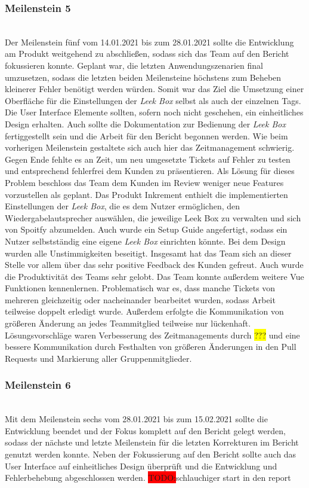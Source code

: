 \documentclass[10pt, a4paper]{article}
\begin{document}
\subsubsection*{Meilenstein 5} $~$ \\
Der Meilenstein fünf vom 14.01.2021 bis zum 28.01.2021 sollte die Entwicklung am Produkt weitgehend zu abschließen, sodass sich das Team auf den Bericht fokussieren konnte.
Geplant war, die letzten Anwendungszenarien final umzusetzen, sodass die letzten beiden Meilensteine höchstens zum Beheben kleinerer Fehler benötigt werden würden.
Somit war das Ziel die Umsetzung einer Oberfläche für die Einstellungen der \textit{Leek Box} selbst als auch der einzelnen Tags.
Die User Interface Elemente sollten, sofern noch nicht geschehen, ein einheitliches Design erhalten.
Auch sollte die Dokumentation zur Bedienung der \textit{Leek Box} fertiggestellt sein und die Arbeit für den Bericht begonnen werden.
Wie beim vorherigen Meilenstein gestaltete sich auch hier das Zeitmanagement schwierig.
Gegen Ende fehlte es an Zeit, um neu umgesetzte Tickets auf Fehler zu testen und entsprechend fehlerfrei dem Kunden zu präsentieren.
Als Lösung für dieses Problem beschloss das Team dem Kunden im Review weniger neue Features vorzustellen als geplant.
Das Produkt Inkrement enthielt die implementierten Einstellungen der \textit{Leek Box}, die es dem Nutzer ermöglichen, den Wiedergabelautsprecher auswählen, die jeweilige Leek Box zu verwalten und sich von Spoitfy abzumelden.
Auch wurde ein Setup Guide angefertigt, sodass ein Nutzer selbstständig eine eigene \textit{Leek Box} einrichten könnte.
Bei dem Design wurden alle Unstimmigkeiten beseitigt.
Insgesamt hat das Team sich an dieser Stelle vor allem über das sehr positive Feedback des Kunden gefreut.
Auch wurde die Produktivität des Teams sehr gelobt.
Das Team konnte außerdem weitere Vue Funktionen kennenlernen.
Problematisch war es, dass manche Tickets von mehreren gleichzeitig oder nacheinander bearbeitet wurden, sodass Arbeit teilweise doppelt erledigt wurde.
Außerdem erfolgte die Kommunikation von größeren Änderung an jedes Teammitglied teilweise nur lückenhaft.
Lösungsvorschläge waren Verbesserung des Zeitmanagements durch \colorbox{yellow}{???} und eine bessere Kommunikation durch Festhalten von größeren Änderungen in den Pull Requests und Markierung aller Gruppenmitglieder.

\subsubsection*{Meilenstein 6} $~$ \\
Mit dem Meilenstein sechs vom 28.01.2021 bis zum 15.02.2021 sollte die Entwicklung beendet und der Fokus komplett auf den Bericht gelegt werden, sodass der nächste und letzte Meilenstein für die letzten Korrekturen im Bericht genutzt werden konnte.
Neben der Fokussierung auf den Bericht sollte auch das User Interface auf einheitliches Design überprüft und die Entwicklung und Fehlerbehebung abgeschlossen werden.
\colorbox{red}{TODO:}schlauchiger start in den report
\end{document}
